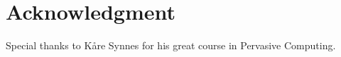 \section*{Acknowledgment}

Special thanks to Kåre Synnes for his great course in Pervasive Computing.

